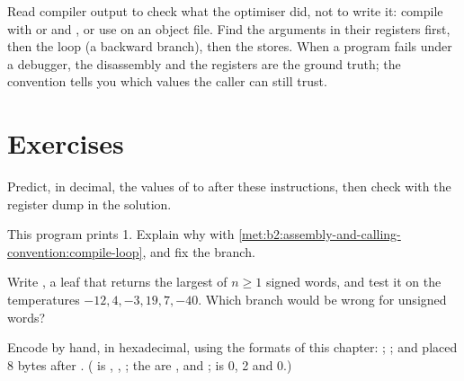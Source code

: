 \label{out:b2:assembly-and-calling-convention:gcc-switch}

\begin{inpractice}
Read compiler output to check what the optimiser did, not to write it: compile with  or  and
, or use  on an object file. Find the arguments in their registers first, then the loop
(a backward branch), then the stores. When a program fails under a debugger, the disassembly and the registers are
the ground truth; the convention tells you which values the caller can still trust.
\end{inpractice}

\section{Exercises}\label{sec:b2:assembly-and-calling-convention:exercises}

\begin{exercise}[$\star$]\label{exo:b2:assembly-and-calling-convention:1}
Predict, in decimal, the values of  to  after these instructions, then check with the register
dump in the solution.
\end{exercise}

\begin{exercise}[$\star$]\label{exo:b2:assembly-and-calling-convention:2}
This program prints 1. Explain why with \cref{met:b2:assembly-and-calling-convention:compile-loop}, and fix the
branch.
\end{exercise}

\begin{exercise}[$\star$]\label{exo:b2:assembly-and-calling-convention:3}
Write , a leaf that returns the largest of $n \ge 1$ signed words, and test it on
the temperatures $-12, 4, -3, 19, 7, -40$. Which branch would be wrong for unsigned words?
\end{exercise}

\begin{exercise}[$\star$]\label{exo:b2:assembly-and-calling-convention:4}
Encode by hand, in hexadecimal, using the formats of this chapter: ; ;
and  placed 8 bytes after . ( is ,  ,
 ; the  are ,  and ;  is 0, 2 and 0.)
\end{exercise}

